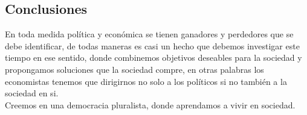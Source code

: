 \begin{multicols}{2}
\subsection*{Conclusiones}
En toda medida política y económica se tienen ganadores y perdedores que se debe identificar, de todas maneras es casi un hecho que debemos investigar este tiempo en ese sentido, donde combinemos objetivos deseables para la sociedad y propongamos soluciones que la sociedad compre, en otras palabras los economistas tenemos que dirigirnos no solo a los políticos si no también a la sociedad en si. \\
Creemos en una democracia pluralista, donde  aprendamos a vivir en sociedad.

\end{multicols}
